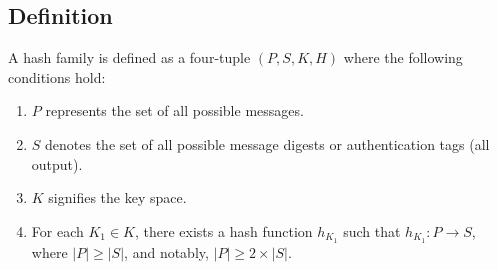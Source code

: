 \documentclass[11pt]{article}
\begin{document}
\subsection*{Definition}
A hash family is defined as a four-tuple $(P, S, K, H)$ where the following conditions hold:
\begin{enumerate}
    \item $P$ represents the set of all possible messages.
    \item $S$ denotes the set of all possible message digests or authentication tags (all output).
    \item $K$ signifies the key space.
    \item For each $K_1 \in K$, there exists a hash function $h_{K_1}$ such that $h_{K_1} : P \rightarrow S$, where $|P| \geq |S|$, and notably, $|P| \geq 2 \times |S|$.
\end{enumerate}
\end{document}
